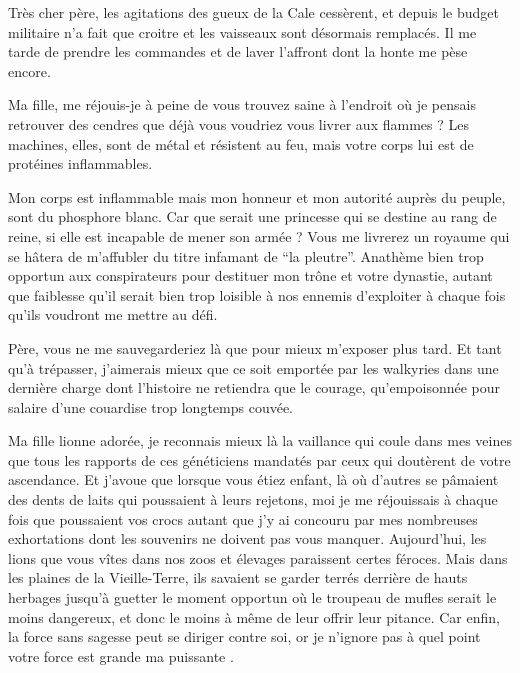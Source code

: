 \scene

\StageDirII{\ela, \roi}




\begin{drama}
  \elaspeaks  Très cher père, les agitations des gueux de la Cale cessèrent, et depuis le budget militaire n’a fait que croitre et les vaisseaux sont désormais remplacés. Il me tarde de prendre les commandes et de laver l’affront dont la honte me pèse encore.

  \roispeaks  Ma fille, me réjouis-je à peine de vous trouvez saine à l’endroit où je pensais retrouver des cendres que déjà vous voudriez vous livrer aux flammes ? Les machines, elles, sont de métal et résistent au feu, mais votre corps lui est de protéines inflammables.

  \elaspeaks Mon corps est inflammable mais mon honneur et mon autorité auprès du peuple, sont du phosphore blanc. Car que serait une princesse qui se destine au rang de reine, si elle est incapable de mener son armée ? Vous me livrerez un royaume qui se hâtera de m’affubler du titre infamant de \enquote{\princesse la pleutre}. Anathème  bien trop opportun aux conspirateurs pour destituer mon trône et votre dynastie, autant que faiblesse qu’il serait bien trop loisible à nos ennemis d’exploiter à chaque fois qu’ils voudront me mettre au défi.

  Père, vous ne me sauvegarderiez là que pour mieux m’exposer plus tard. Et tant qu’à trépasser, j’aimerais mieux que ce soit emportée par les walkyries dans une dernière charge dont l’histoire ne retiendra que le courage, qu’empoisonnée pour salaire d’une couardise trop longtemps  couvée.

  \roispeaks  Ma fille lionne adorée, je reconnais mieux là la vaillance qui coule dans mes veines que tous les rapports de ces généticiens mandatés par ceux qui doutèrent de votre ascendance. Et j’avoue que lorsque vous étiez enfant, là où d’autres se pâmaient des dents de laits qui poussaient à leurs rejetons, moi je me réjouissais à chaque fois que poussaient vos crocs autant que j’y ai concouru par mes nombreuses exhortations dont les souvenirs ne doivent pas vous manquer. Aujourd’hui, les lions que vous vîtes dans nos zoos et élevages paraissent certes féroces. Mais dans les plaines de la Vieille-Terre, ils savaient se garder terrés derrière de hauts herbages jusqu’à guetter le moment opportun où le troupeau de mufles serait le moins dangereux, et donc le moins à même de leur offrir leur pitance. Car enfin, la force sans sagesse peut se diriger contre soi, or je n’ignore pas à quel point votre force est grande ma puissante \princesse{}.


\end{drama}
